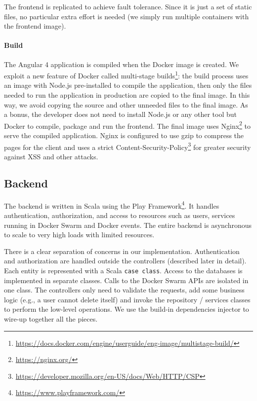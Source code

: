 The frontend is replicated to achieve fault tolerance.
Since it is just a set of static files, no particular extra effort is needed (we simply run multiple containers with the frontend image).

\paragraph{Build}
The Angular 4 application is compiled when the Docker image is created.
We exploit a new feature of Docker called multi-stage builds\footnote{\url{https://docs.docker.com/engine/userguide/eng-image/multistage-build/}}:
the build process uses an image with Node.js pre-installed to compile the application, then only the files needed to run the application in production are copied to the final image.
In this way, we avoid copying the source and other unneeded files to the final image.
As a bonus, the developer does not need to install Node.js or any other tool but Docker to compile, package and run the frontend.
The final image uses Nginx\footnote{\url{https://nginx.org/}} to serve the compiled application.
Nginx is configured to use gzip to compress the pages for the client and uses a strict Content-Security-Policy\footnote{\url{https://developer.mozilla.org/en-US/docs/Web/HTTP/CSP}} for greater security against XSS and other attacks.


\subsection{Backend}
The backend is written in Scala using the Play Framework\footnote{\url{https://www.playframework.com/}}.
It handles authentication, authorization, and access to resources such as users, services running in Docker Swarm and Docker events.
The entire backend is asynchronous to scale to very high loads with limited resources.

There is a clear separation of concerns in our implementation.
Authentication and authorization are handled outside the controllers (described later in detail).
Each entity is represented with a Scala \texttt{case class}.
Access to the databases is implemented in separate classes.
Calls to the Docker Swarm APIs are isolated in one class.
The controllers only need to validate the requests, add some business logic (e.g., a user cannot delete itself) and invoke the repository / services classes to perform the low-level operations.
We use the build-in dependencies injector to wire-up together all the pieces.

